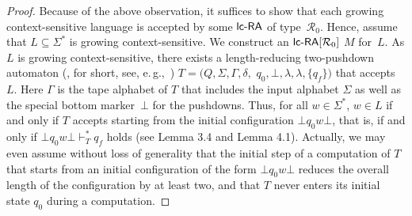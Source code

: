 \noindent
\begin{proof}
Because of the above observation, it suffices to show that each growing context-sensitive language is accepted by some $\lcRA$ of type~$\mathcal{R}_0$. Hence, assume that $L\subseteq\Sigma^*$ is growing context-sensitive. We construct an $\lcRA[0]$ $M$ for~$L$. As $L$ is growing context-sensitive, there exists a length-reducing two-pushdown automaton (\TPDA, for short, see, e.\,g.,~\cite{Buntrock19981}) $T = (Q,\Sigma,\Gamma,\delta,$ $q_0,\bot,\lambda,\lambda,\{q_f\})$ that accepts~$L$. Here $\Gamma$ is the tape alphabet of $T$ that includes the input alphabet $\Sigma$ as well as the special bottom marker~$\bot$ for the pushdowns. Thus, for all $w\in\Sigma^*$, $w\in L$ if and only if $T$ accepts starting from the initial configuration $\bot q_0w\bot$, that is, if and only if $\bot q_0 w\bot\vdash_T^* q_f$ holds (see \cite{N2005} Lemma 3.4 and Lemma 4.1). Actually, we may even assume without loss of generality that the initial step of a computation of $T$ that starts from an initial configuration of the form $\bot q_0w\bot$ reduces the overall length of the configuration by at least two, and that $T$ never enters its initial state $q_0$ during a computation.


\end{proof}
